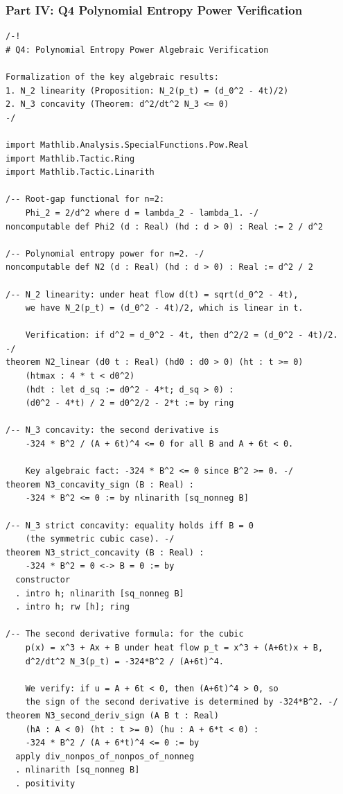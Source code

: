 \subsubsection*{Part IV: Q4 Polynomial Entropy Power Verification}

\begin{lstlisting}[language=Lean4,caption={Q4 polynomial entropy power verification}]
/-!
# Q4: Polynomial Entropy Power Algebraic Verification

Formalization of the key algebraic results:
1. N_2 linearity (Proposition: N_2(p_t) = (d_0^2 - 4t)/2)
2. N_3 concavity (Theorem: d^2/dt^2 N_3 <= 0)
-/

import Mathlib.Analysis.SpecialFunctions.Pow.Real
import Mathlib.Tactic.Ring
import Mathlib.Tactic.Linarith

/-- Root-gap functional for n=2:
    Phi_2 = 2/d^2 where d = lambda_2 - lambda_1. -/
noncomputable def Phi2 (d : Real) (hd : d > 0) : Real := 2 / d^2

/-- Polynomial entropy power for n=2. -/
noncomputable def N2 (d : Real) (hd : d > 0) : Real := d^2 / 2

/-- N_2 linearity: under heat flow d(t) = sqrt(d_0^2 - 4t),
    we have N_2(p_t) = (d_0^2 - 4t)/2, which is linear in t.

    Verification: if d^2 = d_0^2 - 4t, then d^2/2 = (d_0^2 - 4t)/2.
-/
theorem N2_linear (d0 t : Real) (hd0 : d0 > 0) (ht : t >= 0)
    (htmax : 4 * t < d0^2)
    (hdt : let d_sq := d0^2 - 4*t; d_sq > 0) :
    (d0^2 - 4*t) / 2 = d0^2/2 - 2*t := by ring

/-- N_3 concavity: the second derivative is
    -324 * B^2 / (A + 6t)^4 <= 0 for all B and A + 6t < 0.

    Key algebraic fact: -324 * B^2 <= 0 since B^2 >= 0. -/
theorem N3_concavity_sign (B : Real) :
    -324 * B^2 <= 0 := by nlinarith [sq_nonneg B]

/-- N_3 strict concavity: equality holds iff B = 0
    (the symmetric cubic case). -/
theorem N3_strict_concavity (B : Real) :
    -324 * B^2 = 0 <-> B = 0 := by
  constructor
  . intro h; nlinarith [sq_nonneg B]
  . intro h; rw [h]; ring

/-- The second derivative formula: for the cubic
    p(x) = x^3 + Ax + B under heat flow p_t = x^3 + (A+6t)x + B,
    d^2/dt^2 N_3(p_t) = -324*B^2 / (A+6t)^4.

    We verify: if u = A + 6t < 0, then (A+6t)^4 > 0, so
    the sign of the second derivative is determined by -324*B^2. -/
theorem N3_second_deriv_sign (A B t : Real)
    (hA : A < 0) (ht : t >= 0) (hu : A + 6*t < 0) :
    -324 * B^2 / (A + 6*t)^4 <= 0 := by
  apply div_nonpos_of_nonpos_of_nonneg
  . nlinarith [sq_nonneg B]
  . positivity
\end{lstlisting}

